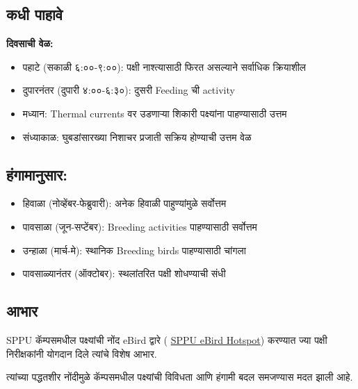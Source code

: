\documentclass[a4paper,12pt,landscape]{memoir}
\newcommand{\introsection}[2]{%
  \begin{minipage}[t]{0.48\textwidth}
    \begin{mdframed}[
      linecolor=headingcolor,
      linewidth=1pt,
      roundcorner=5pt,
      leftmargin=0pt,
      rightmargin=0pt,
      backgroundcolor=headingcolor!5
    ]
      #1
    \end{mdframed}
  \end{minipage}\hfill
  \begin{minipage}[t]{0.48\textwidth}
    \begin{mdframed}[
      linecolor=headingcolor,
      linewidth=1pt,
      roundcorner=5pt,
      leftmargin=0pt,
      rightmargin=0pt,
      backgroundcolor=headingcolor!5
    ]
      #2
    \end{mdframed}
  \end{minipage}
  \newpage
}
\begin{document}
\introsection{%
  \section*{कधी पाहावे}
  \textbf{दिवसाची वेळ:}
  \begin{itemize}
  \item पहाटे (सकाळी ६:००-९:००): पक्षी नाश्त्यासाठी फिरत असल्याने सर्वाधिक क्रियाशील
  \item दुपारनंतर (दुपारी ४:००-६:३०): दुसरी {\latintext Feeding} ची {\latintext activity}
  \item मध्यान: {\latintext Thermal currents} वर उडणाऱ्या शिकारी पक्ष्यांना पाहण्यासाठी उत्तम
  \item संध्याकाळ: घुबडांसारख्या निशाचर प्रजाती सक्रिय होण्याची उत्तम वेळ
  \end{itemize}
}{%
  \section*{हंगामानुसार:}
  \begin{itemize}
  \item हिवाळा (नोव्हेंबर-फेब्रुवारी): अनेक हिवाळी पाहुण्यांमुळे सर्वोत्तम
  \item पावसाळा (जून-सप्टेंबर): {\latintext Breeding activities} पाहण्यासाठी सर्वोत्तम
  \item उन्हाळा (मार्च-मे): स्थानिक {\latintext Breeding birds} पाहण्यासाठी चांगला
  \item पावसाळ्यानंतर (ऑक्टोबर): स्थलांतरित पक्षी शोधण्याची संधी
  \end{itemize}
}

\introsection{%
  \section*{आभार}
  {\latintext SPPU} कॅम्पसमधील पक्ष्यांची नोंद eBird द्वारे ({\latintext
  \href{https://ebird.org/hotspot/L1838309}{SPPU eBird Hotspot}})
  करण्यात ज्या पक्षी निरीक्षकांनी योगदान दिले त्यांचे विशेष आभार.
}{%
  त्यांच्या पद्धतशीर नोंदीमुळे कॅम्पसमधील पक्ष्यांची विविधता आणि हंगामी बदल समजण्यास मदत झाली आहे.
}
\end{document}
